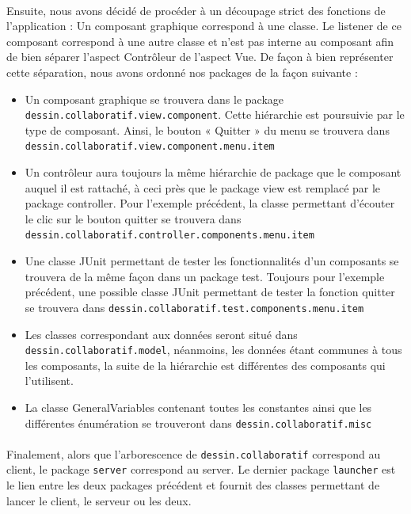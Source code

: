 \documentclass[a4paper,11pt]{article}
\begin{document}
\paragraph{} Ensuite, nous avons décidé de procéder à un découpage strict des fonctions de l'application : Un composant graphique correspond à une classe. Le listener de ce composant correspond à une autre classe et n'est pas interne au composant afin de bien séparer l'aspect Contrôleur de l'aspect Vue. De façon à bien représenter cette séparation, nous avons ordonné nos packages de la façon suivante : 

\begin{itemize}
	\item Un composant graphique se trouvera dans le package \texttt{dessin.collaboratif.view.component}. Cette hiérarchie est poursuivie par le type de composant. Ainsi, le bouton « Quitter » du menu se trouvera dans \texttt{dessin.collaboratif.view.component.menu.item}
	\item Un contrôleur aura toujours la même hiérarchie de package que le composant auquel il est rattaché, à ceci près que le package view est remplacé par le package controller. Pour l'exemple précédent, la classe permettant d'écouter le clic sur le bouton quitter se trouvera dans \\ \texttt{dessin.collaboratif.controller.components.menu.item}
	\item Une classe JUnit permettant de tester les fonctionnalités d'un composants se trouvera de la même façon dans un package test. Toujours pour l'exemple précédent, une possible classe JUnit permettant de tester la fonction quitter se trouvera dans \texttt{dessin.collaboratif.test.components.menu.item}
	\item Les classes correspondant aux données seront situé dans \texttt{dessin.collaboratif.model}, néanmoins, les données étant communes à tous les composants, la suite de la hiérarchie est différentes des composants qui l'utilisent.
	\item La classe GeneralVariables contenant toutes les constantes ainsi que les différentes énumération se trouveront dans \texttt{dessin.collaboratif.misc}
\end{itemize}

\paragraph{} Finalement, alors que l’arborescence de \texttt{dessin.collaboratif} correspond au client, le package \texttt{server} correspond au server. Le dernier package \texttt{launcher} est le lien entre les deux packages précédent et fournit des classes permettant de lancer le client, le serveur ou les deux.
\end{document}

